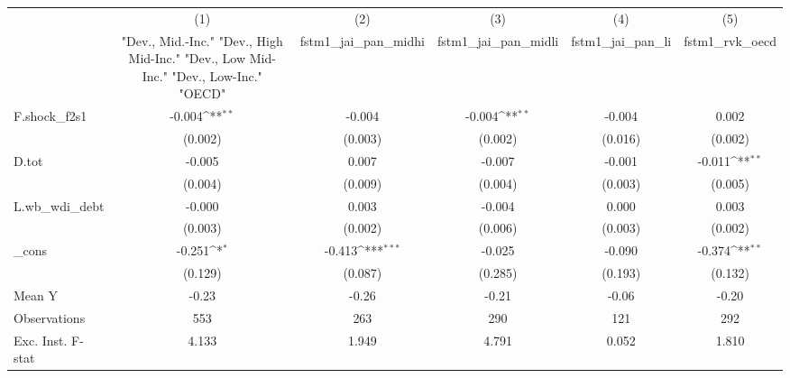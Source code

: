{
\def\sym#1{\ifmmode^{#1}\else\(^{#1}\)\fi}
\begin{tabular}{l*{5}{c}}
\toprule
            &\multicolumn{1}{c}{(1)}&\multicolumn{1}{c}{(2)}&\multicolumn{1}{c}{(3)}&\multicolumn{1}{c}{(4)}&\multicolumn{1}{c}{(5)}\\
            &\multicolumn{1}{c}{ "Dev., Mid.-Inc." "Dev., High Mid-Inc." "Dev., Low Mid-Inc." "Dev., Low-Inc." "OECD" }&\multicolumn{1}{c}{fstm1\_jai\_pan\_midhi}&\multicolumn{1}{c}{fstm1\_jai\_pan\_midli}&\multicolumn{1}{c}{fstm1\_jai\_pan\_li}&\multicolumn{1}{c}{fstm1\_rvk\_oecd}\\
\midrule
F.shock\_f2s1&      -0.004\sym{**} &      -0.004         &      -0.004\sym{**} &      -0.004         &       0.002         \\
            &     (0.002)         &     (0.003)         &     (0.002)         &     (0.016)         &     (0.002)         \\
\addlinespace
D.tot       &      -0.005         &       0.007         &      -0.007         &      -0.001         &      -0.011\sym{**} \\
            &     (0.004)         &     (0.009)         &     (0.004)         &     (0.003)         &     (0.005)         \\
\addlinespace
L.wb\_wdi\_debt&      -0.000         &       0.003         &      -0.004         &       0.000         &       0.003         \\
            &     (0.003)         &     (0.002)         &     (0.006)         &     (0.003)         &     (0.002)         \\
\addlinespace
\_cons      &      -0.251\sym{*}  &      -0.413\sym{***}&      -0.025         &      -0.090         &      -0.374\sym{**} \\
            &     (0.129)         &     (0.087)         &     (0.285)         &     (0.193)         &     (0.132)         \\
\midrule
Mean Y      &       -0.23         &       -0.26         &       -0.21         &       -0.06         &       -0.20         \\
Observations&         553         &         263         &         290         &         121         &         292         \\
Exc. Inst. F-stat&       4.133         &       1.949         &       4.791         &       0.052         &       1.810         \\
\bottomrule
\end{tabular}
}
